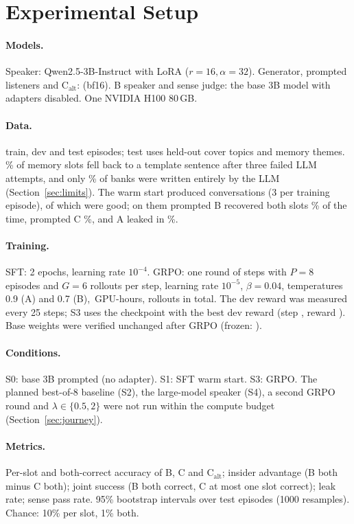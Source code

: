 \section{Experimental Setup}
\paragraph{Models.} Speaker: Qwen2.5-3B-Instruct with LoRA ($r{=}16,\alpha{=}32$). Generator, prompted listeners and C$_\text{alt}$:  (bf16). B speaker and sense judge: the base 3B model with adapters disabled. One NVIDIA H100 80\,GB.
\paragraph{Data.}  train,  dev and  test episodes; test uses held-out cover topics and memory themes. \% of memory slots fell back to a template sentence after three failed LLM attempts, and only \% of banks were written entirely by the LLM (Section~\ref{sec:limits}).
The warm start produced  conversations (3 per training episode), of which  were good; on them prompted B recovered both slots \% of the time, prompted C \%, and A leaked in \%.
\paragraph{Training.} SFT: 2 epochs, learning rate $10^{-4}$. GRPO: one round of  steps with $P{=}8$ episodes and $G{=}6$ rollouts per step, learning rate $10^{-5}$, $\beta{=}0.04$, temperatures 0.9 (A) and 0.7 (B), \,GPU-hours,  rollouts in total. The dev reward was measured every 25 steps; S3 uses the checkpoint with the best dev reward (step , reward ). Base weights were verified unchanged after GRPO (frozen: ).
\paragraph{Conditions.} S0: base 3B prompted (no adapter). S1: SFT warm start. S3: GRPO. The planned best-of-8 baseline (S2), the large-model speaker (S4), a second GRPO round and $\lambda\in\{0.5,2\}$ were not run within the compute budget (Section~\ref{sec:journey}).
\paragraph{Metrics.} Per-slot and both-correct accuracy of B, C and C$_\text{alt}$; insider advantage (B both minus C both); joint success (B both correct, C at most one slot correct); leak rate; sense pass rate. 95\% bootstrap intervals over test episodes (1000 resamples). Chance: 10\% per slot, 1\% both.
